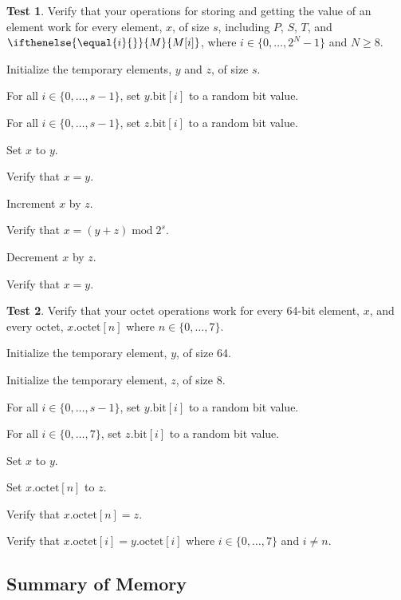 \documentclass[a4paper,12pt]{article}
\newcommand{\MEM}[1]{\ifthenelse{\equal{#1}{}}{M}{M[#1]}}
\newcommand{\PC}{P}
\newcommand{\SP}{S}
\newcommand{\TERM}{T}
\newcommand{\octno}[2]{#1.\mathrm{octet}[#2]}
\newcommand{\bitno}[2]{#1.\mathrm{bit}[#2]}
\newcommand{\range}[2]{\{#1,\ldots,#2\}}
\DeclareMathOperator{\MOD}{mod}
\newcommand{\modulo}[2]{#1 \MOD #2}
\theoremstyle{definition}
\newtheorem{test}{Test}
\begin{document}
\begin{test}
  Verify that your operations for storing and getting the value of an element work for every element, $x$, of size $s$, including $\PC$, $\SP$, $\TERM$, and $\MEM{i}$, where $i \in \range{0}{2^N-1}$ and $N \ge 8$.
  \begin{stepnumbers}
  \item Initialize the temporary elements, $y$ and $z$, of size $s$.
  \item For all $i \in \range{0}{s-1}$, set $\bitno{y}{i}$ to a random bit value.
  \item For all $i \in \range{0}{s-1}$, set $\bitno{z}{i}$ to a random bit value.
  \item Set $x$ to $y$.
  \item Verify that $x = y$.
  \item Increment $x$ by $z$.
  \item Verify that $x = \modulo{(y + z)}{2^s}$.
  \item Decrement $x$ by $z$.
  \item Verify that $x = y$.
  \end{stepnumbers}
\end{test}

\begin{test}
  Verify that your octet operations work for every 64-bit element, $x$, and every octet, $\octno{x}{n}$ where $n \in \range{0}{7}$.
  \begin{stepnumbers}
  \item Initialize the temporary element, $y$, of size 64.
  \item Initialize the temporary element, $z$, of size 8.
  \item For all $i \in \range{0}{s-1}$, set $\bitno{y}{i}$ to a random bit value.
  \item For all $i \in \range{0}{7}$, set $\bitno{z}{i}$ to a random bit value.
  \item Set $x$ to $y$.
  \item Set $\octno{x}{n}$ to $z$.
  \item Verify that $\octno{x}{n} = z$.
  \item Verify that $\octno{x}{i} = \octno{y}{i}$ where $i \in \range{0}{7}$ and $i \neq n$.
  \end{stepnumbers}
\end{test}

\subsection{Summary of Memory}
\end{document}
